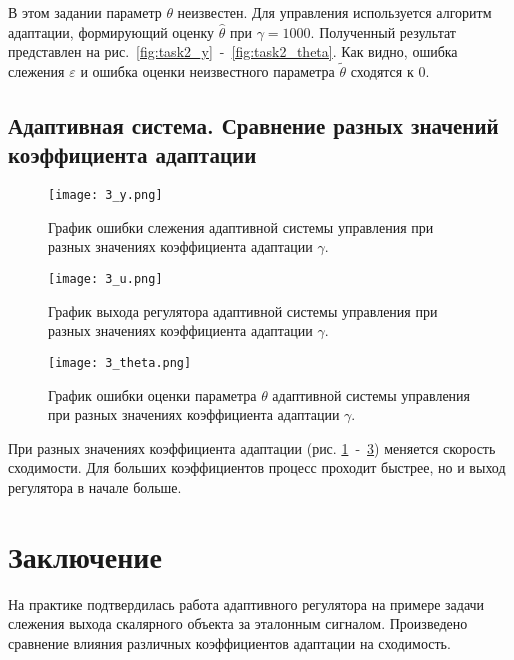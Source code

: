 \documentclass{article}
\begin{document}
В этом задании параметр \(\theta\) неизвестен. 
Для управления используется алгоритм адаптации,
формирующий оценку \(\hat \theta\) при \(\gamma = 1000\). 
Полученный результат представлен на рис.~\ref{fig:task2_y}~-~\ref{fig:task2_theta}. 
Как видно, ошибка слежения \(\varepsilon\) и ошибка оценки неизвестного параметра \(\tilde {\theta}\) сходятся к 0.
\FloatBarrier
\subsection{Адаптивная система. Сравнение разных значений коэффициента адаптации}
\begin{figure}[h!]
  \centering
  \texttt{[image: 3\_y.png]}
  \caption{График ошибки слежения адаптивной системы управления при разных значениях коэффициента адаптации \(\gamma\).}
  \label{fig:task32_y}
\end{figure}
\begin{figure}[h!]
\centering
\texttt{[image: 3\_u.png]}
\caption{График выхода регулятора адаптивной системы управления при разных значениях коэффициента адаптации \(\gamma\).}
\label{fig:task32_u}
\end{figure}

\begin{figure}[h!]
\centering
\texttt{[image: 3\_theta.png]}
\caption{График ошибки оценки параметра \( \theta\) адаптивной системы управления при разных значениях коэффициента адаптации \(\gamma\).}
\label{fig:task32_theta}
\end{figure}
При разных значениях коэффициента адаптации (рис. \ref{fig:task32_y}~-~\ref{fig:task32_theta}) меняется скорость сходимости. Для больших коэффициентов процесс проходит быстрее, но и выход регулятора в начале больше.


\FloatBarrier
\newpage
\section{Заключение}
На практике подтвердилась работа адаптивного регулятора на примере задачи слежения выхода скалярного объекта за
эталонным сигналом.
Произведено сравнение влияния различных коэффициентов адаптации на сходимость. 





\end{document}
